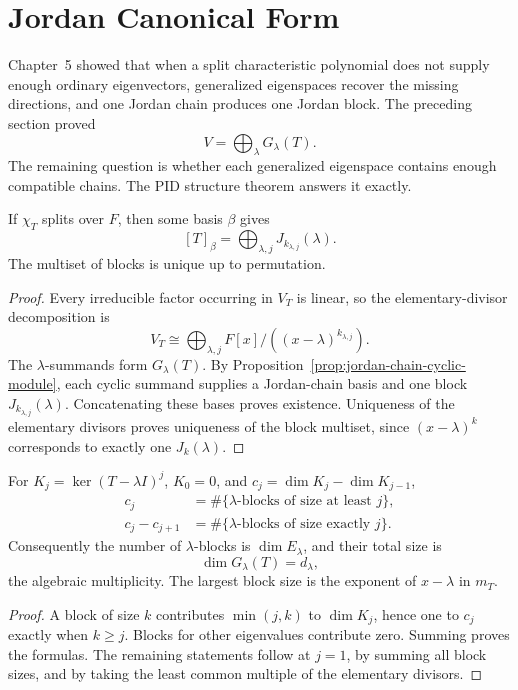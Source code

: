 \section{Jordan Canonical Form}\label{sec:jordan-canonical-form}
Chapter~5 showed that when a split characteristic polynomial does not supply
enough ordinary eigenvectors, generalized eigenspaces recover the missing
directions, and one Jordan chain produces one Jordan block. The preceding
section proved
\[
V=\bigoplus_\lambda G_\lambda(T).
\]
The remaining question is whether each generalized eigenspace contains enough
compatible chains. The PID structure theorem answers it exactly.

\begin{theorem}\label{thm:jordan-canonical-form}
If \(\chi_T\) splits over \(F\), then some basis \(\beta\) gives
\[
[T]_\beta=\bigoplus_{\lambda,j}J_{k_{\lambda,j}}(\lambda).
\]
The multiset of blocks is unique up to permutation.
\end{theorem}
\begin{proof}
Every irreducible factor occurring in \(V_T\) is linear, so the
elementary-divisor decomposition is
\[
V_T\cong\bigoplus_{\lambda,j}
F[x]/((x-\lambda)^{k_{\lambda,j}}).
\]
The \(\lambda\)-summands form \(G_\lambda(T)\). By
Proposition~\ref{prop:jordan-chain-cyclic-module}, each cyclic summand
supplies a Jordan-chain basis and one block
\(J_{k_{\lambda,j}}(\lambda)\). Concatenating these bases proves existence.
Uniqueness of the elementary divisors proves uniqueness of the block
multiset, since \((x-\lambda)^k\) corresponds to exactly one
\(J_k(\lambda)\).
\end{proof}

\begin{corollary}
\label{cor:jordan-kernel-growth}
For \(K_j=\ker(T-\lambda I)^j\), \(K_0=0\), and
\(c_j=\dim K_j-\dim K_{j-1}\),
\[
\begin{aligned}
c_j&=\#\{\lambda\text{-blocks of size at least }j\},\\
c_j-c_{j+1}&=\#\{\lambda\text{-blocks of size exactly }j\}.
\end{aligned}
\]
Consequently the number of \(\lambda\)-blocks is
\(\dim E_\lambda\), and their total size is
\[
\dim G_\lambda(T)=d_\lambda,
\]
the algebraic multiplicity. The largest block size is the exponent of
\(x-\lambda\) in \(m_T\).
\end{corollary}
\begin{proof}
A block of size \(k\) contributes \(\min(j,k)\) to \(\dim K_j\), hence one
to \(c_j\) exactly when \(k\geq j\). Blocks for other eigenvalues contribute
zero. Summing proves the formulas. The remaining statements follow at
\(j=1\), by summing all block sizes, and by taking the least common multiple
of the elementary divisors.
\end{proof}

